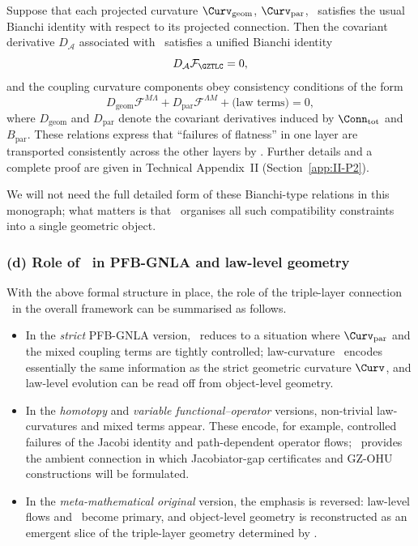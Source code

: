 \documentclass[11pt]{book}
\theoremstyle{plain}
\theoremstyle{definition}
\begin{document}
\begin{proposition}
  Suppose that each projected curvature
  $\Curv_{\mathrm{geom}}$, $\Curv_{\mathrm{par}}$, \GZLCurv\ satisfies
  the usual Bianchi identity with respect to its projected connection.
  Then the covariant derivative $D_{\mathcal{A}}$ associated with
  \GZTLC\ satisfies a unified Bianchi identity
  \[
      D_{\mathcal{A}}\mathcal{F}_{\GZTLC} = 0,
  \]
  and the coupling curvature components obey consistency conditions
  of the form
  \[
      D_{\mathrm{geom}}\mathcal{F}^{M\Lambda}
      + D_{\mathrm{par}}\mathcal{F}^{\Lambda M}
      + \text{(law terms)} = 0,
  \]
  where $D_{\mathrm{geom}}$ and $D_{\mathrm{par}}$ denote the
  covariant derivatives induced by $\Conn_{\mathrm{tot}}$ and
  $B_{\mathrm{par}}$. These relations express that “failures of
  flatness” in one layer are transported consistently across the other
  layers by \GZTLC.
  Further details and a complete proof are given in Technical Appendix~II
  (Section~\ref{app:II-P2}).
\end{proposition}



We will not need the full detailed form of these Bianchi-type relations
in this monograph; what matters is that \GZTLC\ organises all such
compatibility constraints into a single geometric object.

\subsubsection*{(d) Role of \GZTLC\ in PFB-GNLA and law-level geometry}

With the above formal structure in place, the role of the triple-layer
connection \GZTLC\ in the overall framework can be summarised as
follows.

\begin{itemize}
  \item In the \emph{strict} PFB-GNLA version, \GZTLC\ reduces to a
        situation where $\Curv_{\mathrm{par}}$ and the mixed coupling
        terms are tightly controlled; law-curvature \GZLCurv\ encodes
        essentially the same information as the strict geometric
        curvature $\Curv$, and law-level evolution can be read off from
        object-level geometry.
  \item In the \emph{homotopy} and \emph{variable functional–operator}
        versions, non-trivial law-curvatures and mixed terms appear.
        These encode, for example, controlled failures of the Jacobi
        identity and path-dependent operator flows; \GZTLC\ provides the
        ambient connection in which Jacobiator-gap certificates and
        GZ-OHU constructions will be formulated.
  \item In the \emph{meta-mathematical original} version, the emphasis
        is reversed: law-level flows and \GZLCurv\ become primary, and
        object-level geometry is reconstructed as an emergent slice of
        the triple-layer geometry determined by \GZTLC.
\end{itemize}
\end{document}
